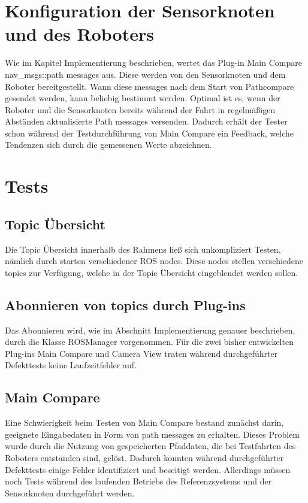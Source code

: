 \section{Konfiguration der Sensorknoten und des Roboters}

Wie im Kapitel Implementierung beschrieben, wertet das Plug-in Main Compare
nav\_msgs::path messages aus. Diese werden von den Sensorknoten und dem Roboter
bereitgestellt. Wann diese messages nach dem Start von Pathcompare gesendet
werden, kann beliebig bestimmt werden. Optimal ist es, wenn der Roboter
und die Sensorknoten bereits während der Fahrt in regelmäßigen Abständen
aktualisierte Path messages versenden.  Dadurch erhält der Tester schon
während der Testdurchführung von Main Compare ein Feedback, welche Tendenzen
sich durch die gemessenen Werte abzeichnen.

\section{Tests}

\subsection{Topic Übersicht}
Die Topic Übersicht innerhalb des Rahmens ließ sich unkompliziert Testen, nämlich durch
starten verschiedener ROS nodes. Diese nodes stellen verschiedene topics zur
Verfügung, welche in der Topic Übersicht eingeblendet werden sollen.

\subsection{Abonnieren von topics durch Plug-ins}
Das Abonnieren wird, wie im Abschnitt Implementierung genauer beschrieben, durch die
Klasse ROSManager vorgenommen. Für die zwei bisher entwickelten Plug-ins Main
Compare und Camera View traten während durchgeführter Defekttests keine
Laufzeitfehler auf.

\subsection{Main Compare}
Eine Schwierigkeit beim Testen von Main Compare bestand zunächst darin,
geeignete Eingabedaten in Form von path messages zu erhalten. 
Dieses Problem wurde durch die Nutzung von gespeicherten Pfaddaten, die bei Testfahrten des
Roboters entstanden sind, gelöst. 
Dadurch konnten während durchgeführter Defekttests einige Fehler
identifiziert und beseitigt werden. Allerdings müssen noch Tests während des
laufenden Betriebs des Referenzsystems und der Sensorknoten durchgeführt werden.

